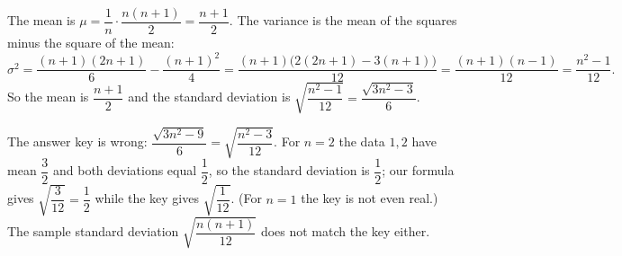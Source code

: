 The mean is $\mu=\dfrac{1}{n}\cdot\dfrac{n(n+1)}{2}=\dfrac{n+1}{2}$. The variance is the mean of the squares minus the square of the mean:
\[
\sigma^2=\dfrac{(n+1)(2n+1)}{6}-\dfrac{(n+1)^2}{4}=\dfrac{(n+1)\bigl(2(2n+1)-3(n+1)\bigr)}{12}=\dfrac{(n+1)(n-1)}{12}=\dfrac{n^2-1}{12}.
\]
So the mean is $\boxed{\dfrac{n+1}{2}}$ and the standard deviation is $\boxed{\sqrt{\dfrac{n^2-1}{12}}=\dfrac{\sqrt{3n^2-3}}{6}}$.

The answer key is wrong: $\dfrac{\sqrt{3n^2-9}}{6}=\sqrt{\dfrac{n^2-3}{12}}$. For $n=2$ the data $1,2$ have mean $\dfrac{3}{2}$ and both deviations equal $\dfrac{1}{2}$, so the standard deviation is $\dfrac{1}{2}$; our formula gives $\sqrt{\dfrac{3}{12}}=\dfrac{1}{2}$ while the key gives $\sqrt{\dfrac{1}{12}}$. (For $n=1$ the key is not even real.) The sample standard deviation $\sqrt{\dfrac{n(n+1)}{12}}$ does not match the key either.
